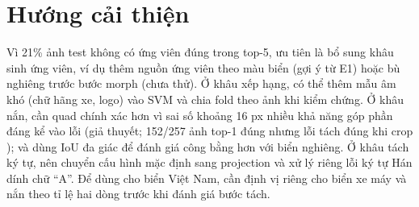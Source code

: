 \section{Hướng cải thiện}
\label{sec:future}

Vì 21\% ảnh test không có ứng viên đúng trong top-5, ưu tiên là bổ sung khâu sinh ứng viên, ví dụ thêm nguồn ứng viên theo màu biển (gợi ý từ E1) hoặc bù nghiêng trước bước morph (chưa thử). Ở khâu xếp hạng, có thể thêm mẫu âm khó (chữ hãng xe, logo) vào SVM và chia fold theo ảnh khi kiểm chứng. Ở khâu nắn, cần quad chính xác hơn vì sai số khoảng 16 px nhiều khả năng góp phần đáng kể vào lỗi (giả thuyết; 152/257 ảnh top-1 đúng nhưng lỗi tách đúng khi crop ); và dùng IoU đa giác để đánh giá công bằng hơn với biển nghiêng. Ở khâu tách ký tự, nên chuyển cấu hình mặc định sang projection và xử lý riêng lỗi ký tự Hán dính chữ ``A''. Để dùng cho biển Việt Nam, cần định vị riêng cho biển xe máy và nắn theo tỉ lệ hai dòng trước khi đánh giá bước tách.
